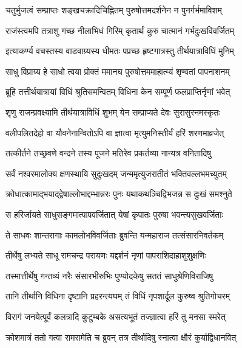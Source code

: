\twolineshloka
{चतुर्भुजत्वं सम्प्राप्तः शङ्खचक्रादिचिह्नितम्}
{पुरुषोत्तमदर्शनेन न पुनर्गर्भमाविशम्}%

\twolineshloka
{राजंस्त्वमपि तत्राशु गच्छ नीलाभिधं गिरिम्}
{कृतार्थं कुरु चात्मानं गर्भदुःखविवर्जितम्}%

\twolineshloka
{इत्याकर्ण्य वचस्तस्य वाडवाग्र्यस्य धीमतः}
{पप्रच्छ हृष्टगात्रस्तु तीर्थयात्राविधिं मुनिम्}%


\twolineshloka
{साधु विप्राग्र्य हे साधो त्वया प्रोक्तं ममानघ}
{पुरुषोत्तममाहात्म्यं शृण्वतां पापनाशनम्}%

\twolineshloka
{ब्रूहि तत्तीर्थयात्रायां विधिं श्रुतिसमन्वितम्}
{विधिना केन सम्पूर्ण फलप्राप्तिर्नृणां भवेत्}%


\twolineshloka
{शृणु राजन्प्रवक्ष्यामि तीर्थयात्राविधिं शुभम्}
{येन सम्प्राप्यते देवः सुरासुरनमस्कृतः}%

\twolineshloka
{वलीपलितदेहो वा यौवनेनान्वितोऽपि वा}
{ज्ञात्वा मृत्युमनिस्तीर्यं हरिं शरणमाव्रजेत्}%

\twolineshloka
{तत्कीर्तने तच्छ्रवणे वन्दने तस्य पूजने}
{मतिरेव प्रकर्तव्या नान्यत्र वनितादिषु}%

\twolineshloka
{सर्वं नश्वरमालोक्य क्षणस्थायि सुदुःखदम्}
{जन्ममृत्युजरातीतं भक्तिवल्लभमच्युतम्}%

\twolineshloka
{क्रोधात्कामाद्भयाद्द्वेषाल्लोभाद्दम्भान्नरः पुनः}
{यथाकथञ्चिद्विभजन्न स दुःखं समश्नुते}%

\twolineshloka
{स हरिर्जायते साधुसङ्गमात्पापवर्जितात्}
{येषां कृपातः पुरुषा भवन्त्यसुखवर्जिताः}%

\twolineshloka
{ते साधवः शान्तरागाः कामलोभविवर्जिताः}
{ब्रुवन्ति यन्महाराज तत्संसारनिवर्तकम्}%

\twolineshloka
{तीर्थेषु लभ्यते साधू रामचन्द्र परायणः}
{यद्दर्शनं नृणां पापराशिदाहाशुशुक्षणिः}%

\twolineshloka
{तस्मात्तीर्थेषु गन्तव्यं नरैः संसारभीरुभिः}
{पुण्योदकेषु सततं साधुश्रेणिविराजिषु}%

\twolineshloka
{तानि तीर्थानि विधिना दृष्टानि प्रहरन्त्यघम्}
{तं विधिं नृपशार्दूल कुरुष्व श्रुतिगोचरम्}%

\twolineshloka
{विरागं जनयेत्पूर्वं कलत्रादि कुटुम्बके}
{असत्यभूतं तज्ज्ञात्वा हरिं तु मनसा स्मरेत्}%

\twolineshloka
{क्रोशमात्रं ततो गत्वा रामरामेति च ब्रुवन्}
{तत्र तीर्थादिषु स्नात्वा क्षौरं कुर्याद्विधानवित्}%

